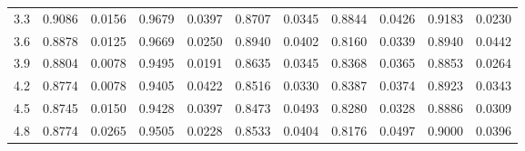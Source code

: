 \begin{tabular}{rrrrrrrrrrr}
       3.3 &   0.9086 & 0.0156 &               0.9679 & 0.0397 &                   0.8707 & 0.0345 &               0.8844 & 0.0426 &                       0.9183 & 0.0230 \\
       3.6 &   0.8878 & 0.0125 &               0.9669 & 0.0250 &                   0.8940 & 0.0402 &               0.8160 & 0.0339 &                       0.8940 & 0.0442 \\
       3.9 &   0.8804 & 0.0078 &               0.9495 & 0.0191 &                   0.8635 & 0.0345 &               0.8368 & 0.0365 &                       0.8853 & 0.0264 \\
       4.2 &   0.8774 & 0.0078 &               0.9405 & 0.0422 &                   0.8516 & 0.0330 &               0.8387 & 0.0374 &                       0.8923 & 0.0343 \\
       4.5 &   0.8745 & 0.0150 &               0.9428 & 0.0397 &                   0.8473 & 0.0493 &               0.8280 & 0.0328 &                       0.8886 & 0.0309 \\
       4.8 &   0.8774 & 0.0265 &               0.9505 & 0.0228 &                   0.8533 & 0.0404 &               0.8176 & 0.0497 &                       0.9000 & 0.0396 \\
\bottomrule
\end{tabular}
